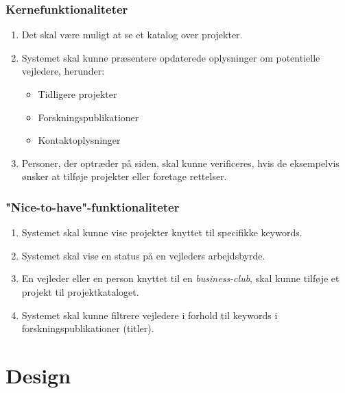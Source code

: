 \documentclass[12pt]{article}
\begin{document}
\subsubsection{Kernefunktionaliteter}
\label{sec:corefuncs}
\begin{enumerate}
	\item Det skal være muligt at se et katalog over projekter.
	\item Systemet skal kunne præsentere opdaterede oplysninger om potentielle vejledere, herunder:
	\begin{itemize}
		\item Tidligere projekter
		\item Forskningspublikationer
		\item Kontaktoplysninger
	\end{itemize}
	\item Personer, der optræder på siden, skal kunne verificeres, hvis de eksempelvis ønsker at tilføje projekter eller foretage rettelser.
\end{enumerate}

\subsubsection{"Nice-to-have"{}-funktionaliteter}
\label{sec:nicefuncs}
\begin{enumerate}
  \item Systemet skal kunne vise projekter knyttet til specifikke keywords.

  \item Systemet skal vise en status på en vejleders arbejdsbyrde.
  \item En vejleder eller en person knyttet til en \textit{business-club}, skal kunne tilføje et projekt til projektkataloget.

	\item Systemet skal kunne filtrere vejledere i forhold til keywords i forskningspublikationer (titler).
\end{enumerate}


\section{Design}
\label{sec:design}
\end{document}
